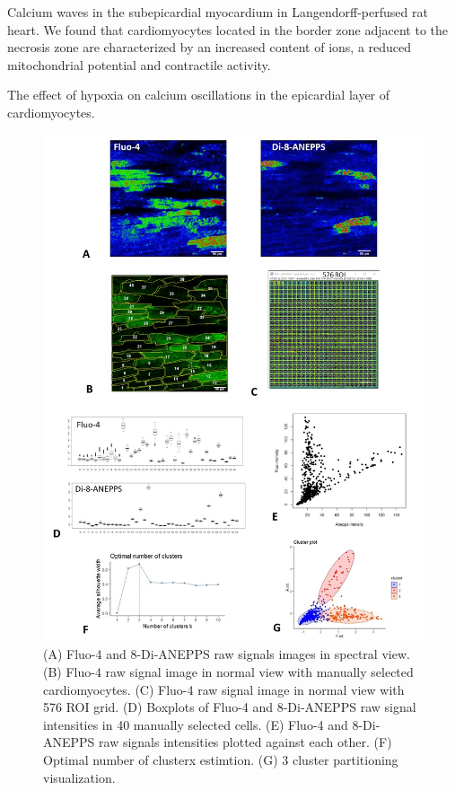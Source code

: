 \documentclass{biophys-new}
\begin{document}
Calcium waves in the subepicardial myocardium in Langendorff-perfused rat heart.
We found that cardiomyocytes located in the border zone adjacent to the necrosis zone are characterized by an increased content of  ions, a reduced mitochondrial potential and contractile activity.


The effect of hypoxia on calcium oscillations in the epicardial layer of cardiomyocytes.

\begin{figure}
    \includegraphics[width=0.9\linewidth]{fig4.jpg}
    \caption{(A) Fluo-4 and 8-Di-ANEPPS raw signals images in spectral view.  (B) Fluo-4 raw signal image in normal view with manually selected cardiomyocytes. (C) Fluo-4 raw signal image in normal view with 576 ROI grid. (D) Boxplots of Fluo-4 and 8-Di-ANEPPS raw signal intensities in 40 manually selected cells. (E) Fluo-4 and 8-Di-ANEPPS raw signals intensities plotted against each other. (F) Optimal number of clusterx estimtion. (G) 3 cluster partitioning visualization.}
    \label{fig:fig4}
\end{figure}
\end{document}
